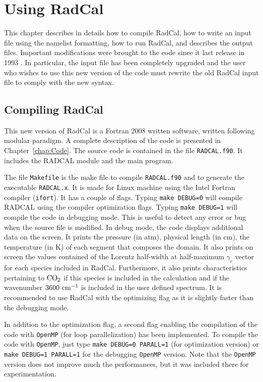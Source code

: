 

\chapter{Using RadCal}
\label{chap::using_RADCAL}

This chapter describes in details how to compile RadCal, how to write an input file using the namelist formatting, how to run RadCal, and describes the output files. Important modifications were brought to the code since it last release in 1993 \cite{Grosshandler1993}. In particular, the input file has been completely upgraded and the user who wishes to use this new version of the code must rewrite the old RadCal input file to comply with the new syntax.

\section{Compiling RadCal}

This new version of RadCal is a Fortran 2008 written software, written following modular paradigm. A complete description of the code is presented in Chapter~\ref{chap:Code}. The source code is contained in the file \verb=RADCAL.f90=. It includes the RADCAL module and the main program.

The file \verb=Makefile= is the make file to compile \verb=RADCAL.f90= and to generate the executable \verb=RADCAL.x=. It is made for Linux machine using the Intel Fortran compiler (\verb=ifort=). It has a couple of flags. Typing \verb'make DEBUG=0' will compile RADCAL using the compiler optimization flags. Typing \verb'make DEBUG=1' will compile the code in debugging mode. This is useful to detect any error or bug when the source file is modified. In debug mode, the code displays additional data on the screen. It prints the pressure (in atm), physical length (in cm), the temperature (in K) of each segment that composes the domain. It also prints on screen the values contained of the Lorentz half-width at half-maximum $\gamma_c$ vector for each species included in RadCal. Furthermore, it also prints characteristics pertaining to $\rm CO_2$ if this species is included in the calculation and if the wavenumber $3600~\rm cm^{-1}$ is included in the user defined spectrum. It is recommended to use RadCal with the optimizing flag as it is slightly faster than the debugging mode.

In addition to the optimization flag, a second flag enabling the compilation of the code with \verb=OpenMP= (for loop parallelization) has been implemented. To compile the code with \verb=OpenMP=, just type \verb'make DEBUG=0 PARALL=1' (for optimization version) or \verb'make DEBUG=1 PARALL=1' for the debugging \verb=OpenMP= version. Note that the \verb=OpenMP= version does not improve much the performances, but it was included there for experimentation.

